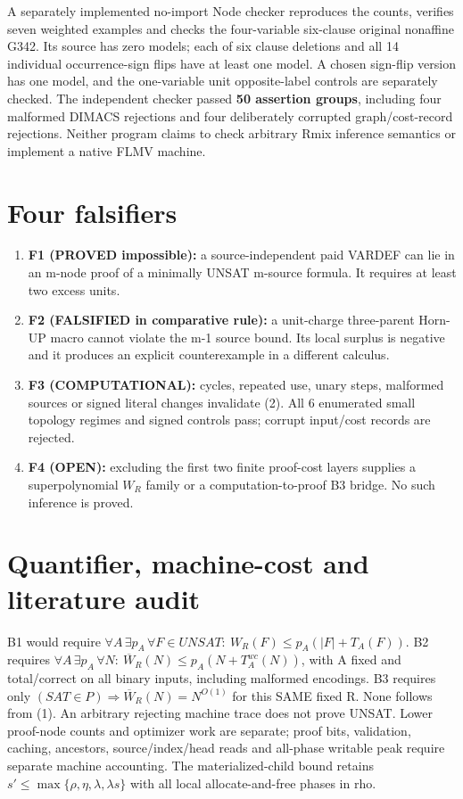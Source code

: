 \documentclass[11pt]{article}
\begin{document}
A separately implemented no-import Node checker reproduces the counts, verifies seven weighted examples and checks the four-variable six-clause original nonaffine G342. Its source has zero models; each of six clause deletions and all 14 individual occurrence-sign flips have at least one model. A chosen sign-flip version has one model, and the one-variable unit opposite-label controls are separately checked. The independent checker passed \textbf{50 assertion groups}, including four malformed DIMACS rejections and four deliberately corrupted graph/cost-record rejections. Neither program claims to check arbitrary Rmix inference semantics or implement a native FLMV machine.

\section*{Four falsifiers}
\begin{enumerate}
\item[] \textbf{F1 (PROVED impossible):} a source-independent paid VARDEF can lie in an m-node proof of a minimally UNSAT m-source formula. It requires at least two excess units.
\item[] \textbf{F2 (FALSIFIED in comparative rule):} a unit-charge three-parent Horn-UP macro cannot violate the m-1 source bound. Its local surplus is negative and it produces an explicit counterexample in a different calculus.
\item[] \textbf{F3 (COMPUTATIONAL):} cycles, repeated use, unary steps, malformed sources or signed literal changes invalidate (2). All 6 enumerated small topology regimes and signed controls pass; corrupt input/cost records are rejected.
\item[] \textbf{F4 (OPEN):} excluding the first two finite proof-cost layers supplies a superpolynomial $W_R$ family or a computation-to-proof B3 bridge. No such inference is proved.
\end{enumerate}

\section*{Quantifier, machine-cost and literature audit}
B1 would require $\forall A\,\exists p_A\,\forall F\in UNSAT:\ W_R(F)\le p_A(|F|+T_A(F))$. B2 requires $\forall A\,\exists p_A\,\forall N:\ \overline W_R(N)\le p_A(N+T_A^{wc}(N))$, with A fixed and total/correct on all binary inputs, including malformed encodings. B3 requires only $(SAT\in P)\Rightarrow\overline W_R(N)=N^{O(1)}$ for this SAME fixed R. None follows from (1). An arbitrary rejecting machine trace does not prove UNSAT. Lower proof-node counts and optimizer work are separate; proof bits, validation, caching, ancestors, source/index/head reads and all-phase writable peak require separate machine accounting. The materialized-child bound retains $s'\le\max\{\rho,\eta,\lambda,\lambda s\}$ with all local allocate-and-free phases in rho.
\end{document}
